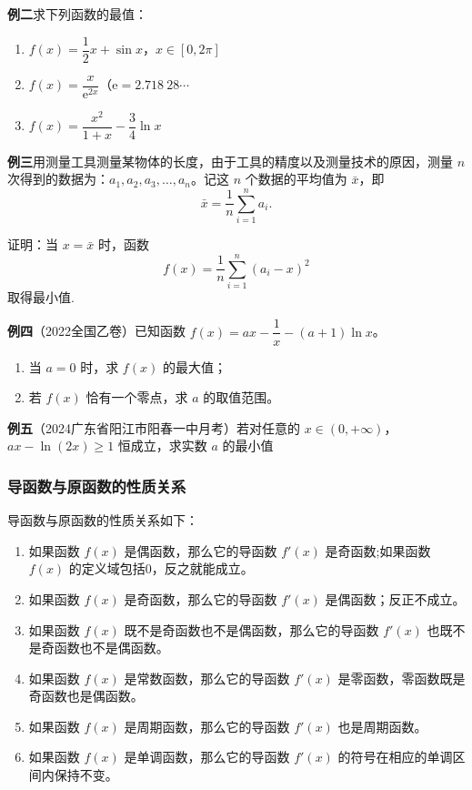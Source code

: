 \documentclass{article}
\begin{document}
\noindent \textbf{例二}\;\;求下列函数的最值：
\begin{enumerate}
    \item  \(f(x) = \dfrac{1}{2}x + \sin x\)，\(x \in [0, 2\pi]\) 
    \item  \(f(x) = \dfrac{x}{\mathrm{e}^{2x}}\)（\(\mathrm{e} = 2.718\ 28\cdots\) 
    \item  \(f(x) = \dfrac{x^2}{1 + x} - \dfrac{3}{4}\ln x\) 
\end{enumerate}
\vspace{10\baselineskip}

\noindent \textbf{例三}\;\;用测量工具测量某物体的长度，由于工具的精度以及测量技术的原因，测量 \(n\) 次得到的数据为：\(a_1, a_2, a_3, \dots, a_n\)。记这 \(n\) 个数据的平均值为 \(\bar{x}\)，即
\[
\bar{x} = \frac{1}{n}\sum_{i=1}^{n} a_i.
\]

证明：当 \(x = \bar{x}\) 时，函数
\[
f(x) = \frac{1}{n}\sum_{i=1}^{n} (a_i - x)^2
\]
取得最小值.
\newpage

\noindent \textbf{例四}（2022全国乙卷）已知函数 \(f(x) = ax - \dfrac{1}{x} - (a + 1)\ln x\)。
\begin{enumerate}
    \item 当 \(a = 0\) 时，求 \(f(x)\) 的最大值；
    \item 若 \(f(x)\) 恰有一个零点，求 \(a\) 的取值范围。
\end{enumerate}
\vspace{30\baselineskip}

\noindent \textbf{例五}（2024广东省阳江市阳春一中月考）若对任意的 \(x \in (0, +\infty)\)，\(ax - \ln(2x) \ge 1\) 恒成立，求实数 \(a\) 的最小值
\newpage

\subsubsection{导函数与原函数的性质关系}
导函数与原函数的性质关系如下：
\begin{enumerate}
    \item 如果函数 \(f(x)\) 是偶函数，那么它的导函数 \(f'(x)\) 是奇函数;如果函数 \(f(x)\) 的定义域包括0，反之就能成立。
    \item 如果函数 \(f(x)\) 是奇函数，那么它的导函数 \(f'(x)\) 是偶函数；反正不成立。
    \item 如果函数 \(f(x)\) 既不是奇函数也不是偶函数，那么它的导函数 \(f'(x)\) 也既不是奇函数也不是偶函数。
    \item 如果函数 \(f(x)\) 是常数函数，那么它的导函数 \(f'(x)\) 是零函数，零函数既是奇函数也是偶函数。
    \item 如果函数 \(f(x)\) 是周期函数，那么它的导函数 \(f'(x)\) 也是周期函数。
    \item 如果函数 \(f(x)\) 是单调函数，那么它的导函数 \(f'(x)\) 的符号在相应的单调区间内保持不变。
\end{enumerate}
\end{document}
